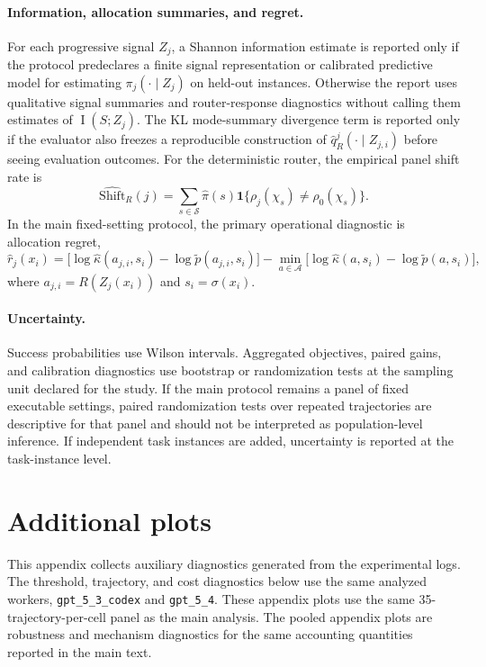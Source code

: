 \documentclass{article}
\DeclareMathOperator{\MI}{I}
\newcommand{\cA}{\mathcal{A}}
\newcommand{\cS}{\mathcal{S}}
\newcommand{\one}{\mathbf{1}}
\begin{document}
\paragraph{Information, allocation summaries, and regret.}
For each progressive signal $Z_j$, a Shannon information estimate is reported only if the protocol predeclares a finite signal representation or calibrated predictive model for estimating $\pi_j(\cdot\mid Z_j)$ on held-out instances.
Otherwise the report uses qualitative signal summaries and router-response diagnostics without calling them estimates of $\MI(S;Z_j)$.
The KL mode-summary divergence term is reported only if the evaluator also freezes a reproducible construction of $\hat q_R^j(\cdot\mid Z_{j,i})$ before seeing evaluation outcomes.
For the deterministic router, the empirical panel shift rate is
\[
\widehat{\mathrm{Shift}}_R(j)=
\sum_{s\in\cS}\hat\pi(s)\one\{\rho_j(\chi_s)\ne\rho_0(\chi_s)\}.
\]
In the main fixed-setting protocol, the primary operational diagnostic is allocation regret,
\[
\hat r_j(x_i)
=
\bigl[\log\hat\kappa(a_{j,i},s_i)-\log\tilde p(a_{j,i},s_i)\bigr]
-
\min_{a\in\cA}
\bigl[\log\hat\kappa(a,s_i)-\log\tilde p(a,s_i)\bigr],
\]
where $a_{j,i}=R(Z_j(x_i))$ and $s_i=\sigma(x_i)$.

\paragraph{Uncertainty.}
Success probabilities use Wilson intervals.
Aggregated objectives, paired gains, and calibration diagnostics use bootstrap or randomization tests at the sampling unit declared for the study.
If the main protocol remains a panel of fixed executable settings, paired randomization tests over repeated trajectories are descriptive for that panel and should not be interpreted as population-level inference.
If independent task instances are added, uncertainty is reported at the task-instance level.

\section{Additional plots}
\label{app:diagnostic-plots}

This appendix collects auxiliary diagnostics generated from the experimental logs.
The threshold, trajectory, and cost diagnostics below use the same analyzed workers, \texttt{gpt\_5\_3\_codex} and \texttt{gpt\_5\_4}.
These appendix plots use the same 35-trajectory-per-cell panel as the main analysis.
The pooled appendix plots are robustness and mechanism diagnostics for the same accounting quantities reported in the main text.
\end{document}

